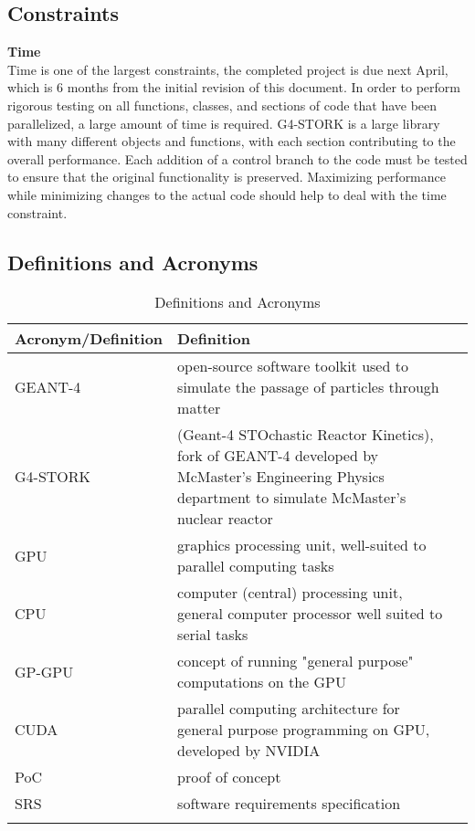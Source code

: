 \documentclass[12pt]{article}
\begin{document}
\subsection{Constraints} %
\textbf{Time}\\
Time is one of the largest constraints, the completed project is due next April, which is 6 months from the initial revision of this document. In order to perform rigorous testing on all functions, classes, and sections of code that have been parallelized, a  large amount of time is required. G4-STORK is a large library with many different objects and functions, with each section contributing to the overall performance. Each addition of a control branch to the code must be tested to ensure that the original functionality is preserved. Maximizing performance while minimizing changes to the actual code should help to deal with the time constraint.
\textbf{}\\


\subsection{Definitions and Acronyms} %
\begin{table}[h]
\centering
\caption{Definitions and Acronyms}
\begin{tabular}{|l|l|l|}
\Xhline{2\arrayrulewidth}
\bf Acronym/Definition & \bf Definition\\\hline
GEANT-4 & open-source software toolkit used to simulate the passage of particles through matter\\
G4-STORK & (Geant-4 STOchastic Reactor Kinetics), fork of GEANT-4 developed by McMaster's Engineering Physics department to simulate McMaster's nuclear reactor\\
GPU & graphics processing unit, well-suited to parallel computing tasks\\
CPU & computer (central) processing unit, general computer processor well suited to serial tasks\\
GP-GPU & concept of running "general purpose" computations on the GPU\\
CUDA & parallel computing architecture for general purpose programming on GPU, developed by NVIDIA\\
PoC & proof of concept\\
SRS & software requirements specification\\
\Xhline{2\arrayrulewidth}
\end{tabular}
\end{table}
\end{document}
